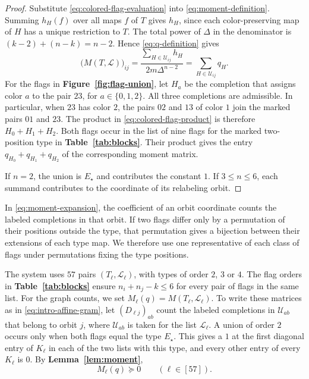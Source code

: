 \documentclass[preprint,11pt,numbers]{elsarticle-arxiv}
\numberwithin{equation}{section}
\theoremstyle{definition}
\begin{document}
\begin{proof}
Substitute \eqref{eq:colored-flag-evaluation} into
\eqref{eq:moment-definition}. Summing $h_H(f)$ over all maps
$f$ of $T$ gives $h_H$, since each color-preserving map of $H$
has a unique restriction to $T$. The total power of $\Delta$ in
the denominator is $(k-2)+(n-k)=n-2$. Hence
\eqref{eq:q-definition} gives
\begin{equation}\label{eq:moment-expansion}
 \bigl(M(T,\mathcal L)\bigr)_{ij}
 =\frac{\displaystyle\sum_{H\in\mathcal U_{ij}}h_H}{2m\Delta^{n-2}}
 =\sum_{H\in\mathcal U_{ij}}q_H.
\end{equation}
For the flags in \textbf{Figure~\ref{fig:flag-union}}, let $H_a$ be
the completion that assigns color $a$ to the pair $23$, for
$a\in\{0,1,2\}$. All three completions are admissible. In particular,
when $23$ has color $2$, the pairs $02$ and $13$ of color $1$ join
the marked pairs $01$ and $23$. The product in
\eqref{eq:colored-flag-product} is therefore $H_0+H_1+H_2$.
Both flags occur in the list of nine flags for the marked
two-position type in \textbf{Table~\ref{tab:blocks}}. Their product
gives the entry $q_{H_0}+q_{H_1}+q_{H_2}$ of the corresponding
moment matrix.

If $n=2$, the union is $E_\star$ and contributes the constant $1$.
If $3\leq n\leq6$, each summand contributes to the coordinate of
its relabeling orbit.
\end{proof}

In \eqref{eq:moment-expansion}, the coefficient of an orbit coordinate
counts the labeled completions in that orbit. If two flags differ
only by a permutation of their positions outside the type, that
permutation gives a bijection between their extensions of each
type map. We therefore use one representative of each class of
flags under permutations fixing the type positions.

The system uses $57$ pairs $(T_\ell,\mathcal L_\ell)$, with types of
order $2$, $3$ or $4$. The flag orders in
\textbf{Table~\ref{tab:blocks}} ensure $n_i+n_j-k\leq6$ for every
pair of flags in the same list. For the graph counts, we set
$M_\ell(q)=M(T_\ell,\mathcal L_\ell)$. To write these matrices as in
\eqref{eq:intro-affine-gram}, let $(D_{\ell j})_{ab}$ count the labeled
completions in $\mathcal U_{ab}$ that belong to orbit $j$, where
$\mathcal U_{ab}$ is taken for the list $\mathcal L_\ell$.
A union of order $2$ occurs only when both flags equal the type
$E_\star$. This gives a $1$ at the first diagonal entry of $K_\ell$
in each of the two lists with this type, and every other entry of
every $K_\ell$ is $0$. By \textbf{Lemma~\ref{lem:moment}},
\begin{equation}\label{eq:positive-moments}
 M_\ell(q)\succeq0\qquad(\ell\in[57]).
\end{equation}
\end{document}
